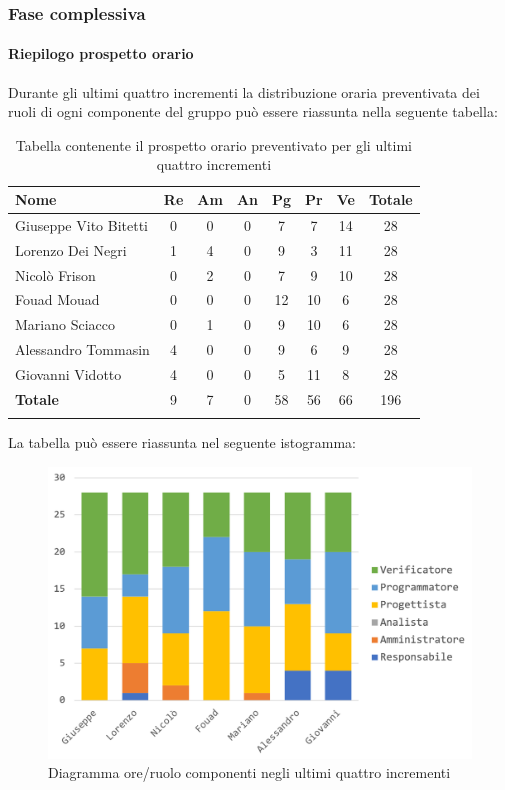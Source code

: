 	\subsubsection{Fase complessiva}
	\paragraph{Riepilogo prospetto orario}
	Durante gli ultimi quattro incrementi la distribuzione oraria preventivata dei ruoli di ogni componente del gruppo può essere riassunta nella seguente tabella:
	
	\begin{longtable}{|l|c|c|c|c|c|c|c|}
		\hline
		\rowcolor{lighter-grayer}
		\textbf{Nome} & \textbf{Re} & \textbf{Am} & \textbf{An} & \textbf{Pg}  & \textbf{Pr}   & \textbf{Ve} & \textbf{Totale} \\
		\hline
		\endfirsthead
		
		\hline
		Giuseppe Vito Bitetti 		 & 0 & 0 & 0 & 7 & 7 & 14 & 28\\
		\hline
		\hline
		Lorenzo Dei Negri			 & 1 & 4 & 0 & 9 & 3 & 11 & 28\\
		\hline
		\hline
		Nicolò Frison				    & 0 & 2 & 0 & 7 & 9 & 10 & 28\\
		\hline
		\hline
		Fouad Mouad 				 & 0 & 0 & 0 & 12 & 10 & 6 & 28\\
		\hline
		\hline
		Mariano Sciacco 			 & 0 & 1 & 0 & 9 & 10 & 6 & 28\\
		\hline
		\hline
		Alessandro Tommasin     & 4 & 0 & 0 & 9 & 6 & 9 & 28\\
		\hline
		\hline
		Giovanni Vidotto 			 & 4 & 0 & 0 & 5 & 11 & 8 & 28\\
		\hline 
		\textbf{Totale}			 		& 9 & 7 & 0 & 58 & 56 & 66 & 196\\
		\hline
		\caption{Tabella contenente il prospetto orario preventivato per gli ultimi quattro incrementi}
	\end{longtable}
	
	La tabella può essere riassunta nel seguente istogramma:
	\begin{figure}[H]
		\centering
		\includegraphics[width=0.8\linewidth]{./images/preventivo/incremento9-12-1.png}
		\caption{Diagramma ore/ruolo componenti negli ultimi quattro incrementi}
		\label{fig:diagramma suddivione ruoli incrementi IX-XII}
	\end{figure}
	\pagebreak
	
